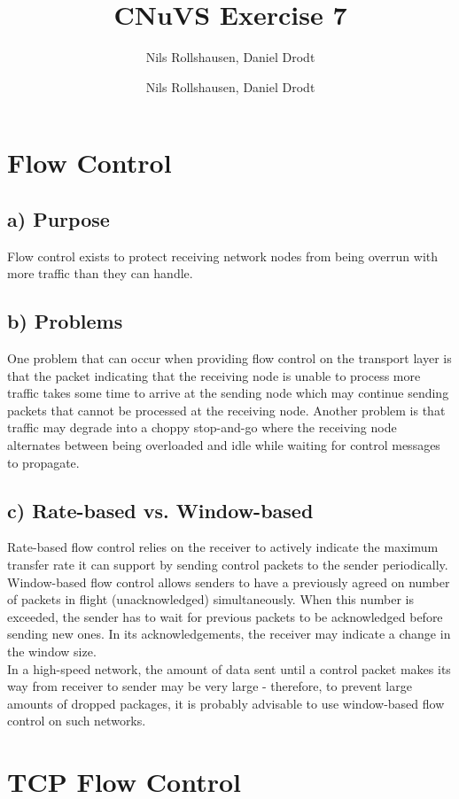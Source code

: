 \documentclass[a4paper, 11 pt, article, accentcolor=tud7b]{tudreport}
\title{CNuVS Exercise 7}
\author{Nils Rollshausen, Daniel Drodt}
\subtitle{Nils Rollshausen, Daniel Drodt}
\begin{document}
	\maketitle
	\section{Flow Control}
	\subsection*{a) Purpose}
	Flow control exists to protect receiving network nodes from being overrun with more traffic than they can handle.
	  
	\subsection*{b) Problems}
	One problem that can occur when providing flow control on the transport layer is that the packet indicating that the receiving node is unable to process more traffic takes some time to arrive at the sending node which may continue sending packets that cannot be processed at the receiving node. Another problem is that traffic may degrade into a choppy stop-and-go where the receiving node alternates between being overloaded and idle while waiting for control messages to propagate.
	
	\subsection*{c) Rate-based vs. Window-based}
	Rate-based flow control relies on the receiver to actively indicate the maximum transfer rate it can support by sending control packets to the sender periodically. Window-based flow control allows senders to have a previously agreed on number of packets in flight (unacknowledged) simultaneously. When this number is exceeded, the sender has to wait for previous packets to be acknowledged before sending new ones. In its acknowledgements, the receiver may indicate a change in the window size. \\
	In a high-speed network, the amount of data sent until a control packet makes its way from receiver to sender may be very large - therefore, to prevent large amounts of dropped packages, it is probably advisable to use window-based flow control on such networks.

  \newpage

	\section{TCP Flow Control}
\end{document}
